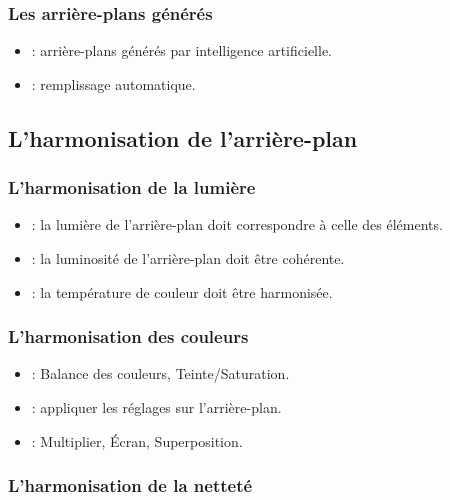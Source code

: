 \subsubsection{Les arrière-plans générés}

\begin{itemize}
    \item {} : arrière-plans générés par intelligence artificielle.
    \item {} : remplissage automatique.
\end{itemize}

\subsection{L'harmonisation de l'arrière-plan}

\subsubsection{L'harmonisation de la lumière}

\begin{itemize}
    \item {} : la lumière de l'arrière-plan doit correspondre à celle des éléments.
    \item {} : la luminosité de l'arrière-plan doit être cohérente.
    \item {} : la température de couleur doit être harmonisée.
\end{itemize}

\subsubsection{L'harmonisation des couleurs}

\begin{itemize}
    \item {} : Balance des couleurs, Teinte/Saturation.
    \item {} : appliquer les réglages sur l'arrière-plan.
    \item {} : Multiplier, Écran, Superposition.
\end{itemize}

\subsubsection{L'harmonisation de la netteté}

